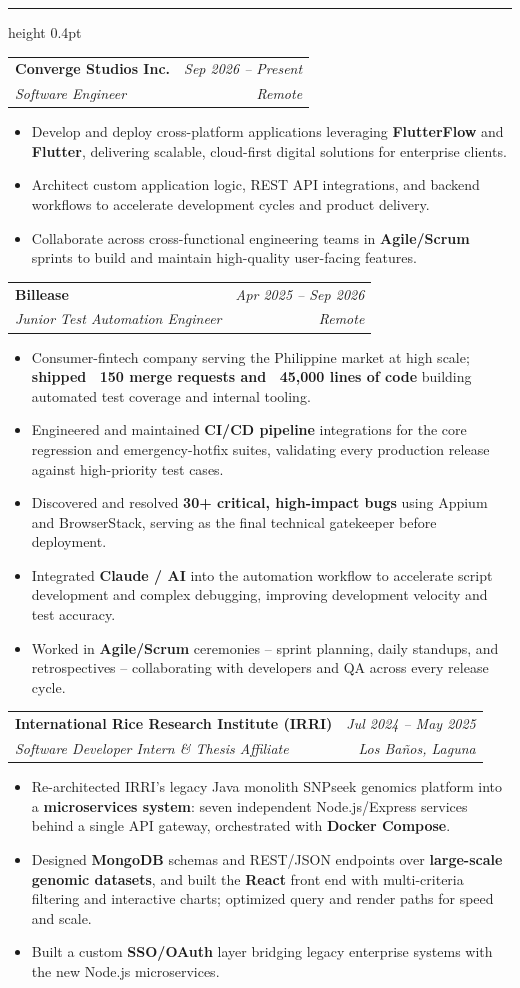 \documentclass[11pt,a4paper]{article}
\makeatletter
\newcommand{\cvsection}[1]{%
  \par\addvspace{9pt}%
  \noindent{\small\bfseries\color{ink}\MakeUppercase{#1}}%
  \par\nobreak\vspace{2.5pt}%
  {\color{ink}\hrule height 0.4pt}%
  \nobreak\vspace{3pt}%
}
\newcommand{\entry}[4]{%
  \par\smallskip
  \noindent\begin{tabular*}{\linewidth}{@{\extracolsep{\fill}}l r@{}}
    \textbf{#1} & {\small\itshape\color{muted}#3} \\[-2pt]
    {\small\itshape\color{muted}#2} & {\small\itshape\color{muted}#4} \\
  \end{tabular*}\par\vspace{-2pt}
}
\makeatother
\begin{document}
\cvsection{Experience}

\entry{Converge Studios Inc.}{Software Engineer}{Sep 2026 -- Present}{Remote}
\begin{itemize}
  \item Develop and deploy cross-platform applications leveraging \textbf{FlutterFlow} and \textbf{Flutter}, delivering scalable, cloud-first digital solutions for enterprise clients.
  \item Architect custom application logic, REST API integrations, and backend workflows to accelerate development cycles and product delivery.
  \item Collaborate across cross-functional engineering teams in \textbf{Agile/Scrum} sprints to build and maintain high-quality user-facing features.
\end{itemize}

\entry{Billease}{Junior Test Automation Engineer}{Apr 2025 -- Sep 2026}{Remote}
\begin{itemize}
  \item Consumer-fintech company serving the Philippine market at high scale; \textbf{shipped ~150 merge requests and ~45{,}000 lines of code} building automated test coverage and internal tooling.
  \item Engineered and maintained \textbf{CI/CD pipeline} integrations for the core regression and emergency-hotfix suites, validating every production release against high-priority test cases.
  \item Discovered and resolved \textbf{30+ critical, high-impact bugs} using Appium and BrowserStack, serving as the final technical gatekeeper before deployment.
  \item Integrated \textbf{Claude / AI} into the automation workflow to accelerate script development and complex debugging, improving development velocity and test accuracy.
  \item Worked in \textbf{Agile/Scrum} ceremonies -- sprint planning, daily standups, and retrospectives -- collaborating with developers and QA across every release cycle.
\end{itemize}

\entry{International Rice Research Institute (IRRI)}{Software Developer Intern \& Thesis Affiliate}{Jul 2024 -- May 2025}{Los Ba\~nos, Laguna}
\begin{itemize}
  \item Re-architected IRRI's legacy Java monolith SNPseek genomics platform into a \textbf{microservices system}: seven independent Node.js/Express services behind a single API gateway, orchestrated with \textbf{Docker Compose}.
  \item Designed \textbf{MongoDB} schemas and REST/JSON endpoints over \textbf{large-scale genomic datasets}, and built the \textbf{React} front end with multi-criteria filtering and interactive charts; optimized query and render paths for speed and scale.
  \item Built a custom \textbf{SSO/OAuth} layer bridging legacy enterprise systems with the new Node.js microservices.
\end{itemize}
\end{document}
